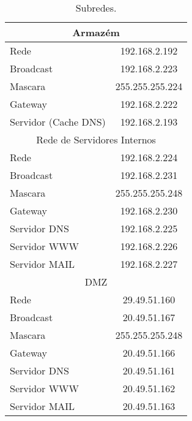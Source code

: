 \documentclass[a4paper,12pt]{article}
\begin{document}
\begin{table}[ht]
\begin{tabular}{ l | c }
      \multicolumn{2}{c}{Armazém} \\\hline 
      Rede & 192.168.2.192 \\\hline 
      Broadcast & 192.168.2.223 \\\hline 
      Mascara & 255.255.255.224 \\\hline
      Gateway & 192.168.2.222 \\\hline
      Servidor (Cache DNS) & 192.168.2.193 \\\hline
      \multicolumn{2}{c}{Rede de Servidores Internos} \\\hline 
      Rede & 192.168.2.224 \\\hline 
      Broadcast & 192.168.2.231 \\\hline 
      Mascara & 255.255.255.248 \\\hline
      Gateway & 192.168.2.230 \\\hline
      Servidor DNS & 192.168.2.225 \\\hline
      Servidor WWW & 192.168.2.226 \\\hline
      Servidor MAIL & 192.168.2.227 \\\hline

      \multicolumn{2}{c}{DMZ} \\\hline 
      Rede & 29.49.51.160 \\\hline 
      Broadcast & 20.49.51.167 \\\hline 
      Mascara & 255.255.255.248 \\\hline
      Gateway & 20.49.51.166 \\\hline
      Servidor DNS & 20.49.51.161 \\\hline
      Servidor WWW & 20.49.51.162 \\\hline
      Servidor MAIL & 20.49.51.163 \\\hline
      \bottomrule
   \end{tabular}
   \caption{Subredes.}
   \label{tab:subredes}
\end{table}
\end{document}
